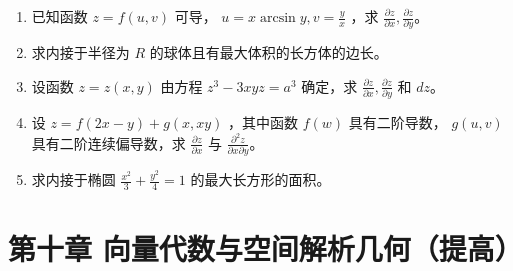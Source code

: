 \documentclass[12pt, a4paper]{article}
\begin{document}
\begin{enumerate}
    \item 已知函数 $ z = f(u, v) $ 可导， $ u = x \arcsin y, v = \frac{y}{x} $ ，求 $ \frac{\partial z}{\partial x}, \frac{\partial z}{\partial y} $。

    \item 求内接于半径为 $R$ 的球体且有最大体积的长方体的边长。

    \item 设函数 $ z = z(x, y) $ 由方程 $ z^{3} - 3xyz = a^{3} $ 确定，求 $ \frac{\partial z}{\partial x}, \frac{\partial z}{\partial y} $ 和 $dz$。

    \item 设 $ z = f(2x - y) + g(x, xy) $ ，其中函数 $ f(w) $ 具有二阶导数， $ g(u, v) $ 具有二阶连续偏导数，求 $ \frac{\partial z}{\partial x} $ 与 $ \frac{\partial^{2}z}{\partial x \partial y} $。

    \item 求内接于椭圆 $ \frac{x^{2}}{3}+\frac{y^{2}}{4}=1 $ 的最大长方形的面积。
\end{enumerate}

\section*{第十章 向量代数与空间解析几何（提高）}
\end{document}
